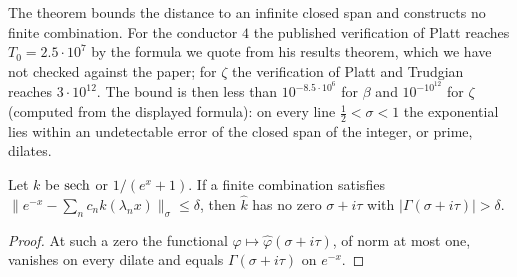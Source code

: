  The theorem bounds the distance to an infinite closed span and constructs no finite combination. For the conductor $4$ the published verification of Platt \cite{Platt16} reaches $T_0=2.5\cdot10^7$ by the formula we quote from his results theorem, which we have not checked against the paper; for $\zeta$ the verification of Platt and Trudgian \cite{PT21} reaches $3\cdot10^{12}$. The bound is then less than $10^{-8.5\cdot10^6}$ for $\beta$ and $10^{-10^{12}}$ for $\zeta$ (computed from the displayed formula): on every line $\frac12<\sigma<1$ the exponential lies within an undetectable error of the closed span of the integer, or prime, dilates.

\begin{corollary}[A certificate]\label{gbm:cor:certificate}
Let $k$ be $\operatorname{sech}$ or $1/(e^x+1)$. If a finite combination satisfies $\|e^{-x}-\sum_nc_nk(\lambda_nx)\|_\sigma\le\delta$, then $\hat k$ has no zero $\sigma+i\tau$ with $|\Gamma(\sigma+i\tau)|>\delta$.
\end{corollary}

\begin{proof}
At such a zero the functional $\varphi\mapsto\hat\varphi(\sigma+i\tau)$, of norm at most one, vanishes on every dilate and equals $\Gamma(\sigma+i\tau)$ on $e^{-x}$.
\end{proof}

